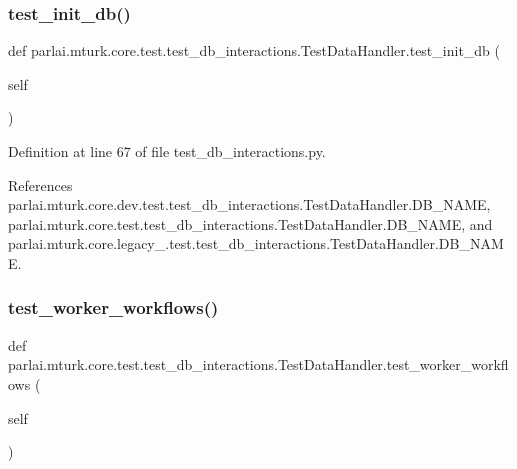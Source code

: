 \subsubsection{\texorpdfstring{test\+\_\+init\+\_\+db()}{test\_init\_db()}}
{\footnotesize\ttfamily def parlai.\+mturk.\+core.\+test.\+test\+\_\+db\+\_\+interactions.\+Test\+Data\+Handler.\+test\+\_\+init\+\_\+db (\begin{DoxyParamCaption}\item[{}]{self }\end{DoxyParamCaption})}



Definition at line 67 of file test\+\_\+db\+\_\+interactions.\+py.



References parlai.\+mturk.\+core.\+dev.\+test.\+test\+\_\+db\+\_\+interactions.\+Test\+Data\+Handler.\+D\+B\+\_\+\+N\+A\+ME, parlai.\+mturk.\+core.\+test.\+test\+\_\+db\+\_\+interactions.\+Test\+Data\+Handler.\+D\+B\+\_\+\+N\+A\+ME, and parlai.\+mturk.\+core.\+legacy\+\_.\+test.\+test\+\_\+db\+\_\+interactions.\+Test\+Data\+Handler.\+D\+B\+\_\+\+N\+A\+ME.

\mbox{\label{classparlai_1_1mturk_1_1core_1_1test_1_1test__db__interactions_1_1TestDataHandler_af40b559a9abdf86a2a62b8cdff096b74}} 
\subsubsection{\texorpdfstring{test\+\_\+worker\+\_\+workflows()}{test\_worker\_workflows()}}
{\footnotesize\ttfamily def parlai.\+mturk.\+core.\+test.\+test\+\_\+db\+\_\+interactions.\+Test\+Data\+Handler.\+test\+\_\+worker\+\_\+workflows (\begin{DoxyParamCaption}\item[{}]{self }\end{DoxyParamCaption})}



